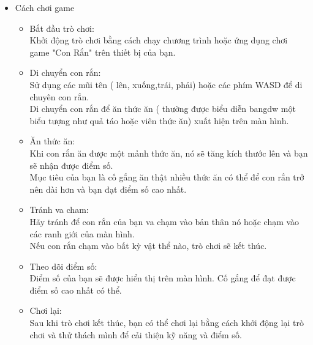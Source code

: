 \documentclass[article]{llncs}
\begin{document}
    \begin{itemize}
        \item Cách chơi game
    \begin{itemize}
        \item Bắt đầu trò chơi:\\ 
        Khởi động trò chơi bằng cách chạy chương trình hoặc ứng dụng chơi game "Con Rắn" trên thiết bị của bạn.
    \end{itemize}
    \begin{itemize}
        \item Di chuyển con rắn:\\
        Sử dụng các mũi tên ( lên, xuống,trái, phải) hoặc các phím WASD để di chuyên con rắn.\\
        Di chuyển con rắn để ăn thức ăn ( thường được biểu diễn bangdw một biểu tượng như quả táo hoặc viên thức ăn) xuất hiện trên màn hình.
    \end{itemize}
    \begin{itemize}
        \item Ăn thức ăn:\\
        Khi con rắn ăn được một mảnh thức ăn, nó sẽ tăng kích thước lên và bạn sẽ nhận được điểm số.\\
        Mục tiêu của bạn là cố gắng ăn thật nhiều thức ăn có thể để con rắn trở nên dài hơn và bạn đạt điểm số cao nhất.
    \end{itemize}
    \begin{itemize}
        \item Tránh va cham:\\
        Hãy tránh để con rắn của bạn va chạm vào bản thân nó hoặc chạm vào các ranh giới của màn hình.\\
        Nếu con rắn chạm vào bất kỳ vật thể nào, trò chơi sẽ kết thúc.
    \end{itemize}
    \begin{itemize}
        \item Theo dõi điểm số:\\
        Điểm số của bạn sẽ được hiển thị trên màn hình. Cố gắng để đạt được điểm số cao nhất có thể.
    \end{itemize}
    \begin{itemize}
        \item Chơi lại:\\
        Sau khi trò chơi kết thúc, bạn có thể chơi lại bằng cách khởi động lại trò chơi và thử thách mình để cải thiện kỹ năng và điểm số.
    \end{itemize}
     \end{itemize}
\newpage
\end{document}
